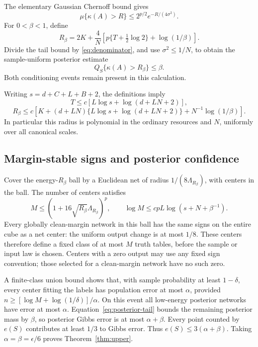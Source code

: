 \documentclass[11pt]{article}
\theoremstyle{remark}\newtheorem{remark}[theorem]{Remark}
\begin{document}
The elementary Gaussian Chernoff bound gives
\[
 \mu\{\kappa(A)>R\}\le2^{p/2}e^{-R/(4\sigma^2)}.
\]
For $0<\beta<1$, define
\begin{equation}\label{eq:energy-radius}
 R_\beta=2K+\frac4N
       \left[p\{T+\tfrac12\log2\}+\log(1/\beta)\right].
\end{equation}
Divide the tail bound by \eqref{eq:denominator}, and use
$\sigma^2\le1/N$, to obtain the sample-uniform posterior estimate
\begin{equation}\label{eq:posterior-tail}
 Q_S\{\kappa(A)>R_\beta\}\le\beta.
\end{equation}
Both conditioning events remain present in this calculation.

Writing $s=d+C+L+B+2$, the definitions imply
\[
 T\le c[L\log s+\log(d+LN+2)],
\]
\[
 R_\beta\le c\left[K+(d+LN)\{L\log s+\log(d+LN+2)\}
                    +N^{-1}\log(1/\beta)\right].
\]
In particular this radius is polynomial in the ordinary resources and
$N$, uniformly over all canonical scales.

\subsection{Margin-stable signs and posterior confidence}

Cover the energy-$R_\beta$ ball by a Euclidean net of radius
$1/(8\Lambda_{R_\beta})$, with centers in the ball. The number of
centers satisfies
\[
 M\le(1+16\sqrt{R_\beta}\Lambda_{R_\beta})^p,
 \qquad
 \log M\le cpL\log(s+N+\beta^{-1}).
\]
Every globally clean-margin network in this ball has the same signs
on the entire cube as a net center: the uniform output change is at
most $1/8$. These centers therefore define a fixed class of at most
$M$ truth tables, before the sample or input law is chosen. Centers
with a zero output may use any fixed sign convention; those selected
for a clean-margin network have no such zero.

A finite-class union bound shows that, with sample probability at least
$1-\delta$, every center fitting the labels has population error at
most $\alpha$, provided $n\ge[\log M+\log(1/\delta)]/\alpha$.
On this event all low-energy posterior networks have error at most
$\alpha$. Equation~\eqref{eq:posterior-tail} bounds the remaining
posterior mass by $\beta$, so posterior Gibbs error is at most
$\alpha+\beta$. Every point counted by $e(S)$ contributes at least
$1/3$ to Gibbs error. Thus $e(S)\le3(\alpha+\beta)$.
Taking $\alpha=\beta=\epsilon/6$ proves Theorem~\ref{thm:upper}.
\end{document}
